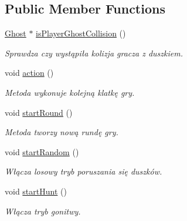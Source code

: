 \subsection*{Public Member Functions}
\begin{DoxyCompactItemize}
\item 
\hyperlink{classGhost}{Ghost} $\ast$ \hyperlink{classGameManager_affd9b70b3b26c7e6cf09a5a503f87bbf}{is\+Player\+Ghost\+Collision} ()
\begin{DoxyCompactList}\small\item\em Sprawdza czy wystąpiła kolizja gracza z duszkiem. \end{DoxyCompactList}\item 
\mbox{\label{classGameManager_af3f088e51e9a9e13d107398bf9591c77}} 
void \hyperlink{classGameManager_af3f088e51e9a9e13d107398bf9591c77}{action} ()
\begin{DoxyCompactList}\small\item\em Metoda wykonuje kolejną \textquotesingle{}klatkę\textquotesingle{} gry. \end{DoxyCompactList}\item 
\mbox{\label{classGameManager_a3aa21d52d6ea7254668136e22c7ea7b6}} 
void \hyperlink{classGameManager_a3aa21d52d6ea7254668136e22c7ea7b6}{start\+Round} ()
\begin{DoxyCompactList}\small\item\em Metoda tworzy nową rundę gry. \end{DoxyCompactList}\item 
\mbox{\label{classGameManager_a94ee1406eebe7612994c73523e388843}} 
void \hyperlink{classGameManager_a94ee1406eebe7612994c73523e388843}{start\+Random} ()
\begin{DoxyCompactList}\small\item\em Włącza losowy tryb poruszania się duszków. \end{DoxyCompactList}\item 
\mbox{\label{classGameManager_a4fad06c8b674c0a8a633cc9cb5efccf5}} 
void \hyperlink{classGameManager_a4fad06c8b674c0a8a633cc9cb5efccf5}{start\+Hunt} ()
\begin{DoxyCompactList}\small\item\em Włącza tryb gonitwy. \end{DoxyCompactList}\item 

\end{DoxyCompactItemize}
